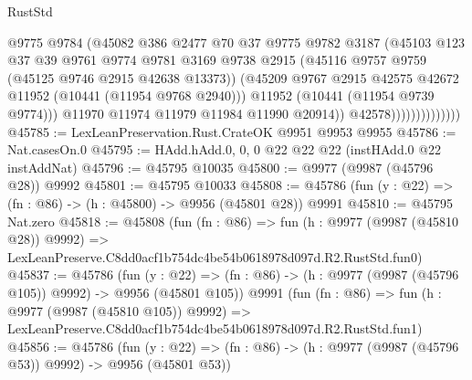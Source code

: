 \begin{lexlean}{RustStd}
\begin{coremodule}
                                  @9775
                                  @9784
                                  (@45082
                                    @386
                                    @2477
                                    @70
                                    @37
                                    @9775
                                    @9782
                                    @3187
                                    (@45103
                                      @123
                                      @37
                                      @39
                                      @9761
                                      @9774
                                      @9781
                                      @3169
                                      @9738
                                      @2915
                                      (@45116 @9757 @9759 (@45125 @9746 @2915 @42638 @13373))
                                      (@45209
                                        @9767
                                        @2915
                                        @42575
                                        @42672
                                        @11952
                                        (@10441 (@11954 @9768 @2940)))
                                      @11952
                                      (@10441 (@11954 @9739 @9774)))
                                    @11970
                                    @11974
                                    @11979
                                    @11984
                                    @11990
                                    @20914))
                                @42578))))))))))))))
@45785 := LexLeanPreservation.Rust.CrateOK @9951 @9953 @9955
@45786 := Nat.casesOn.{0}
@45795 := HAdd.hAdd.{0, 0, 0} @22 @22 @22 (instHAdd.{0} @22 instAddNat)
@45796 := @45795 @10035
@45800 := @9977 (@9987 (@45796 @28)) @9992
@45801 := @45795 @10033
@45808 := @45786 (fun (y : @22) => (fn : @86) -> (h : @45800) -> @9956 (@45801 @28)) @9991
@45810 := @45795 Nat.zero
@45818 := @45808
    (fun (fn : @86) =>
    fun (h : @9977 (@9987 (@45810 @28)) @9992) =>
    LexLeanPreserve.C8dd0acf1b754dc4be54b0618978d097d.R2.RustStd.fun0)
@45837 := @45786
    (fun (y : @22) => (fn : @86) -> (h : @9977 (@9987 (@45796 @105)) @9992) -> @9956 (@45801 @105))
    @9991
    (fun (fn : @86) =>
    fun (h : @9977 (@9987 (@45810 @105)) @9992) =>
    LexLeanPreserve.C8dd0acf1b754dc4be54b0618978d097d.R2.RustStd.fun1)
@45856 := @45786
    (fun (y : @22) => (fn : @86) -> (h : @9977 (@9987 (@45796 @53)) @9992) -> @9956 (@45801 @53))

\end{coremodule}
\end{lexlean}
